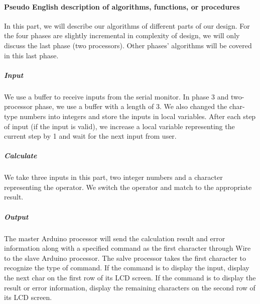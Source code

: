 \paragraph{Pseudo English description of algorithms, functions, or procedures}
\hfill \newline
In this part, we will describe our algorithms of different parts of our design. For the four phases are slightly incremental in complexity of design, we will only discuss the last phase (two processors). Other phases' algorithms will be covered in this last phase.

\subparagraph{Input}
We use a buffer to receive inputs from the serial monitor. In phase 3 and two-processor phase, we use a buffer with a length of 3. We also changed the char-type numbers into integers and store the inputs in local variables. After each step of input (if the input is valid), we increase a local variable representing the current step by 1 and wait for the next input from user.

\subparagraph{Calculate}
We take three inputs in this part, two integer numbers and a character representing the operator. We switch the operator and match to the appropriate result.

\subparagraph{Output}
The master Arduino processor will send the calculation result and error information along with a specified command as the first character through Wire to the slave Arduino processor. The salve processor takes the first character to recognize the type of command. If the command is to display the input, display the next char on the first row of its LCD screen. If the command is to display the result or error information, display the remaining characters on the second row of its LCD screen.

